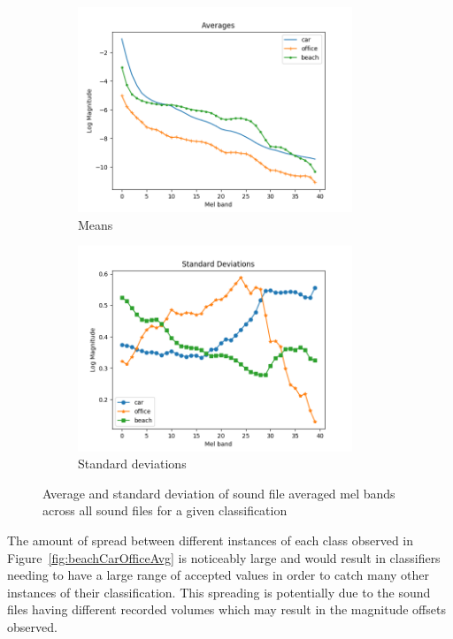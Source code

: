 \documentclass[11pt]{article}
\begin{document}
\begin{figure}[!htbp]
	\centering
	\begin{subfigure}[t]{0.48\textwidth}
		\centering
		\includegraphics[width=0.9\textwidth]{figures/3Means.png}
		\caption{Means}
	\end{subfigure}
	\begin{subfigure}[t]{0.48\textwidth}
		\centering
		\includegraphics[width=0.9\textwidth]{figures/3Stds.png}
		\caption{Standard deviations}
	\end{subfigure}
	\caption{Average and standard deviation of sound file averaged mel bands across all sound files for a given classification}
	\label{fig:avgAndStd}
\end{figure}

The amount of spread between different instances of each class observed in Figure~\ref{fig:beachCarOfficeAvg} is noticeably large and would result in classifiers needing to have a large range of accepted values in order to catch many other instances of their classification. This spreading is potentially due to the sound files having different recorded volumes which may result in the magnitude offsets observed.
\end{document}
